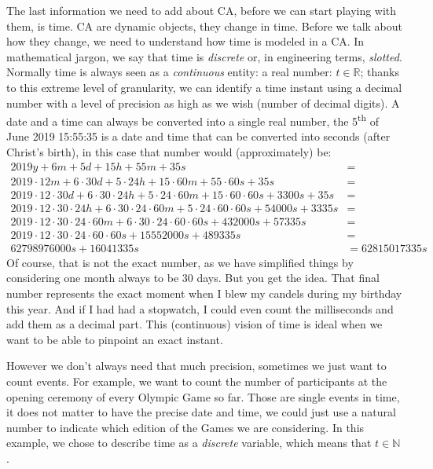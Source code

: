 The last information we need to add about CA, before we can start playing with them, is time.
CA are dynamic objects, they change in time. Before we talk about how they change, we need to
understand how time is modeled in a CA. In mathematical jargon, we say that time is 
\textit{discrete} or, in engineering terms, \textit{slotted}. Normally time is always seen as a
\textit{continuous} entity: a real number: $t \in \mathbb{R}$; thanks to this extreme level of
granularity, we can identify a time instant using a decimal number with a level of precision as high
as we wish (number of decimal digits).
A date and a time can always be converted into a single real number,
the 5\textsuperscript{th} of June 2019 15:55:35 is a date and time that can be converted into seconds
(after Christ's birth), in this case that number would (approximately) be:
\begin{align*}
2019 y + 6 m + 5 d + 15 h + 55 m + 35 s &=\\
2019 \cdot 12 m + 6 \cdot 30 d + 5 \cdot 24 h + 15 \cdot 60 m + 55 \cdot 60 s + 35 s &=\\
2019 \cdot 12 \cdot 30 d + 6 \cdot 30 \cdot 24 h + 5 \cdot 24 \cdot 60 m +
    15 \cdot 60 \cdot 60 s + 3300 s + 35 s &=\\
2019 \cdot 12 \cdot 30 \cdot 24 h + 6 \cdot 30 \cdot 24 \cdot 60 m
    + 5 \cdot 24 \cdot 60 \cdot 60 s +
    54000 s + 3335 s &=\\
2019 \cdot 12 \cdot 30 \cdot 24 \cdot 60 m + 6 \cdot 30 \cdot 24 \cdot 60 \cdot 60 s
    + 432000 s + 57335 s &=\\
2019 \cdot 12 \cdot 30 \cdot 24 \cdot 60 \cdot 60 s + 15552000 s + 489335 s &=\\
62798976000 s + 16041335 s &= 62815017335 s
\end{align*}
Of course, that is not the exact number, as we have simplified things by considering one month always
to be 30 days. But you get the idea. That final number represents
the exact moment when I blew my candels during my birthday this year. And if I had had a stopwatch, I could
even count the milliseconds and add them as a decimal part. This (continuous) vision of time is ideal
when we want to be able to pinpoint an exact instant.

However we don't always need that much precision, sometimes we just want to count events. For example,
we want to count the number of participants at the opening ceremony of every Olympic Game so far.
Those are single events in time, it does not matter to have the precise date and time, we could
just use a natural number to indicate which edition of the Games we are considering. In this example,
we chose to describe time as a \textit{discrete} variable, which means that $t \in \mathbb{N}$.\\

